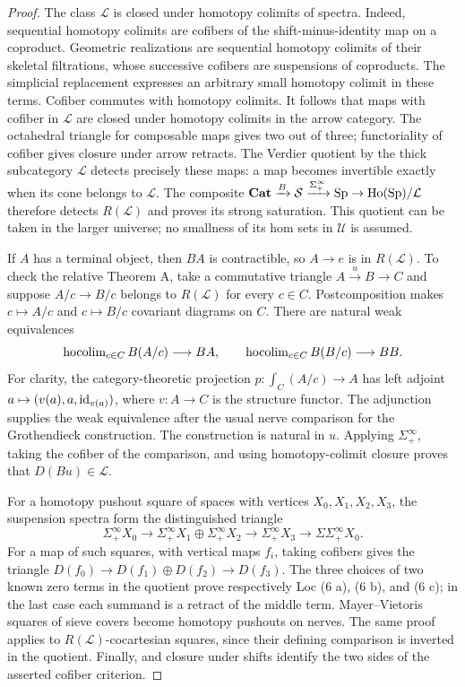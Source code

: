 \begin{proof}
The class $\mathcal L$ is closed under homotopy colimits of spectra. Indeed,
sequential homotopy colimits are cofibers of the shift-minus-identity map on
a coproduct. Geometric realizations are sequential homotopy colimits of
their skeletal filtrations, whose successive cofibers are suspensions of
coproducts. The simplicial replacement expresses an arbitrary small homotopy
colimit in these terms. Cofiber commutes with homotopy colimits. It follows
that maps with cofiber in $\mathcal L$ are closed under homotopy colimits in
the arrow category. The octahedral triangle for composable maps gives two
out of three; functoriality of cofiber gives closure under arrow retracts.
The Verdier quotient by the thick subcategory $\mathcal L$ detects precisely
these maps: a map becomes invertible exactly when its cone belongs to
$\mathcal L$. The composite $\mathbf{Cat}\xrightarrow{B}\mathcal{S}
\xrightarrow{\Sigma^\infty_+}\mathrm{Sp}\to\operatorname{Ho}(\mathrm{Sp})/\mathcal L$ therefore
detects $R(\mathcal L)$ and proves its strong saturation. This quotient can
be taken in the larger universe; no smallness of its hom sets in
$\mathcal U$ is assumed.

If $A$ has a terminal object, then $BA$ is contractible, so $A\to e$ is in
$R(\mathcal L)$. To check the relative Theorem A, take a commutative triangle
$A\xrightarrow{u}B\to C$ and suppose $A/c\to B/c$ belongs to
$R(\mathcal L)$ for every $c\in C$. Postcomposition makes
$c\mapsto A/c$ and $c\mapsto B/c$ covariant diagrams on $C$.
There are natural weak equivalences
\[
 \operatorname{hocolim}_{c\in C}B(A/c)\longrightarrow BA,\qquad
 \operatorname{hocolim}_{c\in C}B(B/c)\longrightarrow BB.
\]
For clarity, the category-theoretic projection
$p:\int_C(A/c)\to A$ has left adjoint
$a\mapsto(v(a),a,\mathrm{id}_{v(a)})$, where $v:A\to C$ is the structure functor.
The adjunction supplies the weak equivalence after the usual nerve
comparison for the Grothendieck construction. The construction is natural
in $u$. Applying $\Sigma^\infty_+$, taking the cofiber of the comparison,
and using homotopy-colimit closure proves that $D(Bu)\in\mathcal L$.

For a homotopy pushout square of spaces with vertices $X_0,X_1,X_2,X_3$,
the suspension spectra form the distinguished triangle
\[
 \Sigma^\infty_+X_0\longrightarrow
 \Sigma^\infty_+X_1\oplus\Sigma^\infty_+X_2\longrightarrow
 \Sigma^\infty_+X_3\longrightarrow\Sigma\Sigma^\infty_+X_0.
\]
For a map of such squares, with vertical maps $f_i$, taking cofibers gives
the triangle $D(f_0)\to D(f_1)\oplus D(f_2)\to D(f_3)$.
The three choices of two known zero terms in the quotient prove respectively
Loc (6 a), (6 b), and (6 c); in the last case each summand is a retract of
the middle term. Mayer--Vietoris squares of sieve covers become homotopy
pushouts on nerves. The same proof applies to $R(\mathcal L)$-cocartesian
squares, since their defining comparison is inverted in the quotient.
Finally,  and closure under shifts identify the two sides of
the asserted cofiber criterion.
\end{proof}

